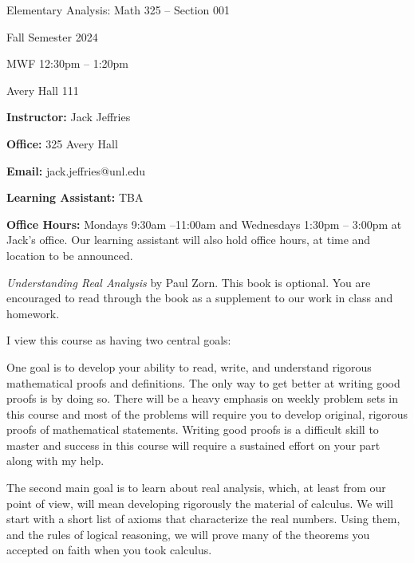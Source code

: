 \documentclass{amsart}
\begin{document}
 








\centerline{\bigbf Elementary Analysis: Math 325 -- Section 001}
\centerline{\bigbf Fall Semester 2024}
\centerline{\bigbf MWF 12:30pm -- 1:20pm }
\centerline{\bigbf Avery Hall 111}


\bigskip

\noindent
{\bf Instructor:}  Jack Jeffries


\noindent
{\bf Office:} 325 Avery Hall

\noindent
{\bf Email:} jack.jeffries@unl.edu

\noindent
{\bf Learning Assistant:}  TBA

\noindent
{\bf Office Hours:} Mondays 9:30am --11:00am and Wednesdays 1:30pm -- 3:00pm at Jack's office. Our learning assistant will also hold office hours, at time and location to be announced.




{\it Understanding Real Analysis} by Paul Zorn. This book is optional. You are encouraged to read through the book as a supplement to our work in class and homework. %


\medskip


I view this course as having two central goals:

One goal is to develop your ability to 
read, write, and understand 
rigorous mathematical proofs and definitions. The only way to get better at writing good 
proofs is by doing so. There will be a heavy emphasis on
weekly problem sets in this course and most of the
problems
will require you to develop original, rigorous
proofs of mathematical statements. Writing good proofs is a
difficult skill to master and success in this course 
will require a sustained effort on your
part along with my help. 

The second main goal is to learn about
real analysis, which, at
least from our point of view, will mean developing rigorously the
material of calculus. We will start with a short list of axioms that
characterize the real numbers.  Using them, and the rules of logical
reasoning, we will prove many of the theorems you accepted on faith
when you took calculus.
\end{document}
